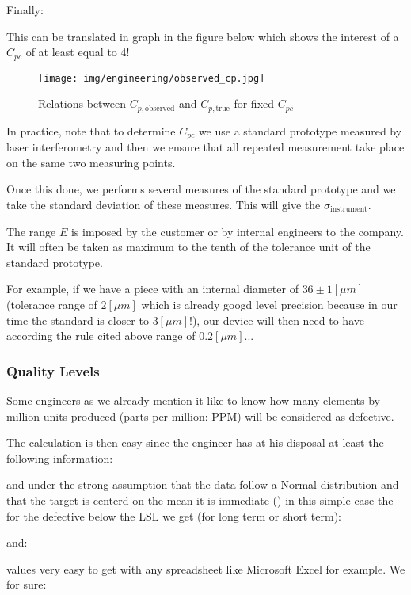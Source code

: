 	Finally:
	
	This can be translated in graph in the figure below which shows the interest of a $C_{pc}$ of at least equal to 4!
	
\begin{figure}[H]
\centering
\texttt{[image: img/engineering/observed\_cp.jpg]}
\caption{Relations between $C_{p,\text{observed}}$ and $C_{p,\text{true}}$ for fixed $C_{pc}$}
\end{figure}

	In practice, note that to determine $C_{pc}$ we use a standard prototype measured by laser interferometry and then we ensure that all repeated measurement take place on the same two measuring points.
	
	Once this done, we performs several measures of the standard prototype and we take the standard deviation of these measures. This will give the $\sigma_{\text{instrument}}$.
	
	The range $E$ is imposed by the customer or by internal engineers to the company. It will often be taken as maximum to the tenth of the tolerance unit of the standard prototype.
	
	For example, if we have a piece with an internal diameter of $36\pm 1 [\mu m]$ (tolerance range of $2 [\mu m]$ which is already googd level precision because in our time the standard is closer to $3 [\mu m]$!), our device will then need to have according the rule cited above range of $0.2[\mu m]$...
	
	\pagebreak
	\subsubsection{Quality Levels}
	
	Some engineers as we already mention it like to know how many elements by million units produced (parts per million: PPM) will be considered as defective.
	
	The calculation is then easy since the engineer has at his disposal at least the following information:
	
	and under the strong assumption that the data follow a Normal distribution and that the target is centerd on the mean it is immediate () in this simple case the for the defective below the LSL we get (for long term or short term):
	
	and:
	
	values very easy to get with any spreadsheet like Microsoft Excel for example.
	We for sure:
	
